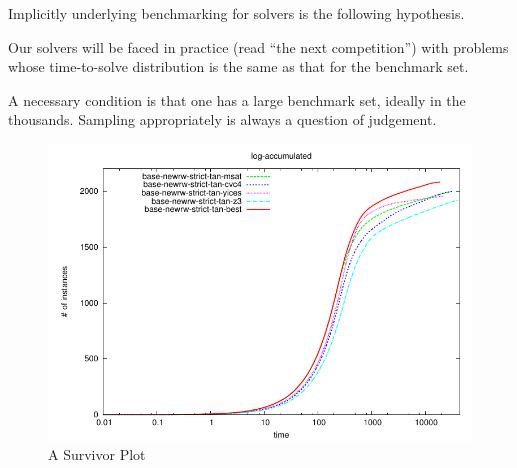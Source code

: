 Implicitly underlying benchmarking for solvers is the following hypothesis.
\begin{hypothesis}Our solvers will be faced in practice (read ``the next competition'') with problems whose time-to-solve distribution is the same as that for the benchmark set.
\end{hypothesis}
A necessary condition is that one has a large benchmark set, ideally in the thousands. Sampling appropriately is always a question of judgement.
\begin{figure}[h]
\caption{A Survivor Plot\label{fig:survivor}}
\includegraphics{log-accumulated2.pdf}
\vskip-0pt
\end{figure}
